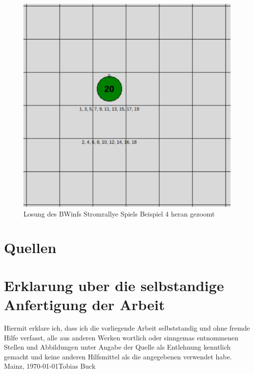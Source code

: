 \documentclass[a4paper,12pt,arial]{scrartcl}
\newcommand{\Name}{Tobias Buck}
\newcommand{\Ort}{Mainz}
\begin{document}
\begin{figure}[h]
    \centering
    \includegraphics[width=\textwidth]{solution_4_zoomed.pdf}
    \caption{Losung des BWinfs Stromrallye Spiels Beispiel 4 heran gezoomt}
    \label{fig:loesung4_zoomed}
\end{figure}


\section{Quellen}


\printbibheading
\printbibliography[type=online,heading=subbibliography,title={Digital}]
\printbibliography[nottype=online,heading=subbibliography,title={Bucher}]



\section{Erklarung uber die selbstandige Anfertigung der Arbeit}
Hiermit erklare ich, dass ich die vorliegende Arbeit selbststandig und ohne fremde Hilfe verfasst, alle aus anderen Werken wortlich oder sinngemas entnommenen Stellen und Abbildungen unter Angabe der Quelle als Entlehnung kenntlich gemacht und keine anderen Hilfsmittel als die angegebenen verwendet habe. \\
\Ort, \today \space \Name
\end{document}
